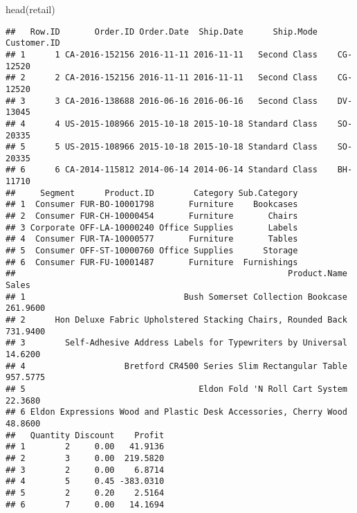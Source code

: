 \documentclass[
]{article}
\newenvironment{Shaded}{\begin{snugshade}}{\end{snugshade}}
\newcommand{\AttributeTok}[1]{\textcolor[rgb]{0.77,0.63,0.00}{#1}}
\newcommand{\DecValTok}[1]{\textcolor[rgb]{0.00,0.00,0.81}{#1}}
\newcommand{\FunctionTok}[1]{\textcolor[rgb]{0.00,0.00,0.00}{#1}}
\newcommand{\NormalTok}[1]{#1}
\newcommand{\OtherTok}[1]{\textcolor[rgb]{0.56,0.35,0.01}{#1}}
\newcommand{\SpecialCharTok}[1]{\textcolor[rgb]{0.00,0.00,0.00}{#1}}
\newcommand{\StringTok}[1]{\textcolor[rgb]{0.31,0.60,0.02}{#1}}
\begin{document}
\begin{Shaded}
\begin{Highlighting}[]
\FunctionTok{head}\NormalTok{(retail)}
\end{Highlighting}
\end{Shaded}

\begin{verbatim}
##   Row.ID       Order.ID Order.Date  Ship.Date      Ship.Mode Customer.ID
## 1      1 CA-2016-152156 2016-11-11 2016-11-11   Second Class    CG-12520
## 2      2 CA-2016-152156 2016-11-11 2016-11-11   Second Class    CG-12520
## 3      3 CA-2016-138688 2016-06-16 2016-06-16   Second Class    DV-13045
## 4      4 US-2015-108966 2015-10-18 2015-10-18 Standard Class    SO-20335
## 5      5 US-2015-108966 2015-10-18 2015-10-18 Standard Class    SO-20335
## 6      6 CA-2014-115812 2014-06-14 2014-06-14 Standard Class    BH-11710
##     Segment      Product.ID        Category Sub.Category
## 1  Consumer FUR-BO-10001798       Furniture    Bookcases
## 2  Consumer FUR-CH-10000454       Furniture       Chairs
## 3 Corporate OFF-LA-10000240 Office Supplies       Labels
## 4  Consumer FUR-TA-10000577       Furniture       Tables
## 5  Consumer OFF-ST-10000760 Office Supplies      Storage
## 6  Consumer FUR-FU-10001487       Furniture  Furnishings
##                                                       Product.Name    Sales
## 1                                Bush Somerset Collection Bookcase 261.9600
## 2      Hon Deluxe Fabric Upholstered Stacking Chairs, Rounded Back 731.9400
## 3        Self-Adhesive Address Labels for Typewriters by Universal  14.6200
## 4                    Bretford CR4500 Series Slim Rectangular Table 957.5775
## 5                                   Eldon Fold 'N Roll Cart System  22.3680
## 6 Eldon Expressions Wood and Plastic Desk Accessories, Cherry Wood  48.8600
##   Quantity Discount    Profit
## 1        2     0.00   41.9136
## 2        3     0.00  219.5820
## 3        2     0.00    6.8714
## 4        5     0.45 -383.0310
## 5        2     0.20    2.5164
## 6        7     0.00   14.1694
\end{verbatim}

\begin{Shaded}
\end{Shaded}
\end{document}
